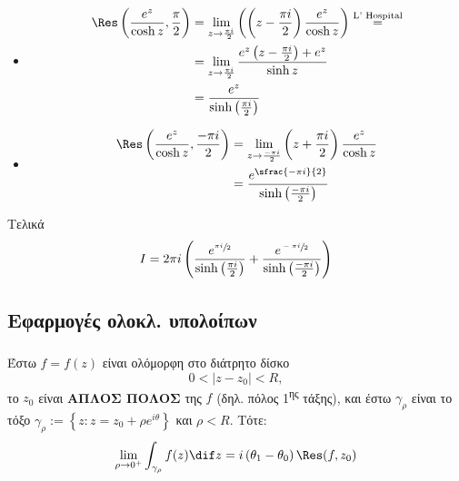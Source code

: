 \documentclass[12pt,a4paper,notitlepage,fleqn]{article}
\begin{document}
\begin{enumgreekparen}
    	\begin{itemize}
    	\item \begin{align*}
    		\Res\left(\frac{e^z}{\cosh z},\frac{\pi}{2}\right)
    		&= \lim_{z\to\frac{\pi i}{2}} \left(
    		\left(z-\frac{\pi i}{2}\right)\frac{e^z}{\cosh z}
    		\right) \overset{\text{L' Hospital}}{=}
    		\\ &=
    		\lim_{z\to \frac{\pi i}{2}}
    		\frac{e^z\left(z-\frac{\pi i}{2}\right)+e^z}{\sinh z}
    		\\ &= \frac{e^{z}}{\sinh\left(\frac{\pi i}{2}\right)}
              \end{align*}

         \item \begin{align*}
                 \Res\left(\frac{e^z}{\cosh z},\frac{-\pi i}{2}\right)
                 &= \lim_{z\to \frac{-\pi i}{2}} \left(z+\frac{\pi i }{2}\right)
                   \frac{e^z}{\cosh z}
                 \\ &= \frac{e^{\sfrac{-\pi i}{2} }}{\sinh\left(\frac{-\pi i}{2} \right)}
    		\end{align*}
    	\end{itemize}

    	\item Τελικά
    	\[
    	I = 2\pi i \left(
    	\frac{e^{\sfrac{\pi i}{2} }}{\sinh\left(\frac{\pi i}{2}\right)} +
    	\frac{e^{\sfrac{-\pi i}{2} }}{\sinh\left(\frac{-\pi i}{2}\right)}
    	\right)
    	\]
    \end{enumgreekparen}

    \subsection{Εφαρμογές ολοκλ. υπολοίπων}
    \subsubsection[Λήμμα Jordan]{}
    Έστω \( f=f(z) \) είναι ολόμορφη στο διάτρητο δίσκο
    \[
    0 < |z-z_0| < R,
    \]
    το \( z_0 \) είναι \textbf{ΑΠΛΟΣ ΠΟΛΟΣ} της \( f \)
    (δηλ. πόλος 1\textsuperscript{ης} τάξης), και έστω \( \gamma_\rho \) είναι
    το τόξο \( \gamma_\rho := \left\lbrace z:z=z_0+\rho e^{i\theta} \right\rbrace \)
    και \( \rho < R \). Τότε:
    \[
    \lim_{\rho\to 0^+} \int_{\gamma_\rho} f(z) \dif z
    = i\left(\theta_1 - \theta_0\right)\Res(f,z_0)
    \]
\end{document}
